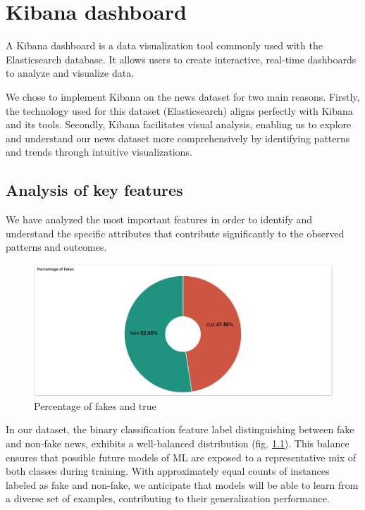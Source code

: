 
\chapter{Kibana dashboard}
\label{ch:chapter_three}%
A Kibana dashboard is a data visualization tool commonly used with the Elasticsearch database. It allows users to create interactive, real-time dashboards to analyze and visualize data.

We chose to implement Kibana on the news dataset for two main reasons. Firstly, the technology used for this dataset (Elasticsearch) aligns perfectly with Kibana and its tools. Secondly, Kibana facilitates visual analysis, enabling us to explore and understand our news dataset more comprehensively by identifying patterns and trends through intuitive visualizations.

\newpage

\section{Analysis of key features}
We have analyzed the most important features in order to identify and understand the specific attributes that contribute significantly to the observed patterns and outcomes.

\begin{figure}[h]
  \centering
  \includegraphics[width=1.0\linewidth]{Images/kibana_1.png}
  \caption{Percentage of fakes and true}
  \label{fig:kibana_1}
\end{figure}

In our dataset, the binary classification feature label distinguishing between fake and non-fake news, exhibits a well-balanced distribution (fig. \ref{fig:kibana_1}). This balance ensures that possible future models of ML are exposed to a representative mix of both classes during training. With approximately equal counts of instances labeled as fake and non-fake, we anticipate that models will be able to learn from a diverse set of examples, contributing to their generalization performance.

